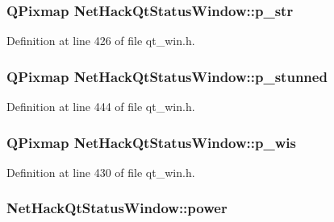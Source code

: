 \hypertarget{classNetHackQtStatusWindow_a60609089200e45ad3d0717e9fc0f5f7e}{
\subsubsection[{p\+\_\+str}]{\setlength{\rightskip}{0pt plus 5cm}Q\+Pixmap Net\+Hack\+Qt\+Status\+Window\+::p\+\_\+str\hspace{0.3cm}{\ttfamily [private]}}}\label{classNetHackQtStatusWindow_a60609089200e45ad3d0717e9fc0f5f7e}


Definition at line 426 of file qt\+\_\+win.\+h.

\hypertarget{classNetHackQtStatusWindow_acda1675d5647d69e66284a1df78b5d78}{
\subsubsection[{p\+\_\+stunned}]{\setlength{\rightskip}{0pt plus 5cm}Q\+Pixmap Net\+Hack\+Qt\+Status\+Window\+::p\+\_\+stunned\hspace{0.3cm}{\ttfamily [private]}}}\label{classNetHackQtStatusWindow_acda1675d5647d69e66284a1df78b5d78}


Definition at line 444 of file qt\+\_\+win.\+h.

\hypertarget{classNetHackQtStatusWindow_a6267aa499ffecc5df99fd6935ed0bae2}{
\subsubsection[{p\+\_\+wis}]{\setlength{\rightskip}{0pt plus 5cm}Q\+Pixmap Net\+Hack\+Qt\+Status\+Window\+::p\+\_\+wis\hspace{0.3cm}{\ttfamily [private]}}}\label{classNetHackQtStatusWindow_a6267aa499ffecc5df99fd6935ed0bae2}


Definition at line 430 of file qt\+\_\+win.\+h.

\hypertarget{classNetHackQtStatusWindow_a5e5afb49e436b7cba86e4348fa42838c}{
\subsubsection[{power}]{ Net\+Hack\+Qt\+Status\+Window\+::power\hspace{0.3cm}{\ttfamily [private]}}}\label{classNetHackQtStatusWindow_a5e5afb49e436b7cba86e4348fa42838c}


